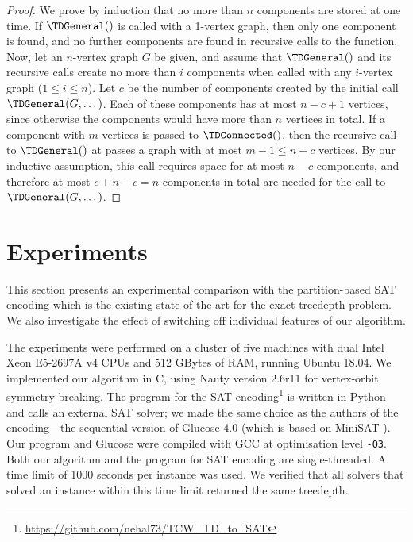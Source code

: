 {\begin{proof}
      We prove by induction that no more than $n$ components are stored at one time.
      If $\TDGeneral()$ is called with a 1-vertex graph, then only one component
      is found, and no further components are found in recursive calls to the function.
      Now, let an $n$-vertex graph $G$ be given, and assume that $\TDGeneral()$ and its
      recursive calls create no more than $i$ components when called with any $i$-vertex
      graph ($1 \leq i \leq n$).  Let $c$ be the number of components created by
      the initial call $\TDGeneral(G, \dots)$.
      Each of these components has at most $n - c + 1$ vertices, since otherwise the
      components would have more than $n$ vertices in total.  If a component
      with $m$ vertices is passed to $\TDConnected()$, then the recursive
      call to $\TDGeneral()$ at  passes a graph
      with at most $m - 1 \leq n - c$ vertices.  By our inductive assumption, this
      call requires space for at most $n - c$ components, and therefore at most
      $c + n - c = n$ components in total are needed for the call to $\TDGeneral(G, \dots)$.
    \end{proof}

    \section{Experiments}\label{sec:experiments}

    This section presents an experimental comparison with the partition-based
    SAT encoding \cite{DBLP:conf/alenex/GanianLOS19,DBLP:journals/corr/abs-1911-12995} which is the existing state
    of the art for the exact treedepth
    problem.  We also investigate the effect
    of switching off individual features of our algorithm.

    The experiments were performed
    on a cluster of five machines with dual Intel Xeon E5-2697A v4 CPUs and 512 GBytes
    of RAM, running Ubuntu 18.04.  We implemented our algorithm in C, using Nauty version 2.6r11 for vertex-orbit symmetry breaking.
    The program for the SAT encoding\footnote{\url{https://github.com/nehal73/TCW_TD_to_SAT}}
    is written in Python and calls an external SAT solver;
    we made the same choice as the authors of the encoding---the sequential version of Glucose 4.0 (which is based on
    MiniSAT \cite{DBLP:conf/sat/EenS03}).
    Our program and Glucose were compiled with GCC at optimisation level \texttt{-O3}.
    Both our algorithm and the program for SAT encoding
    are single-threaded.  A time limit of 1000 seconds per instance was used.  We verified that
    all solvers that solved an instance within this time limit returned the same treedepth.

}
